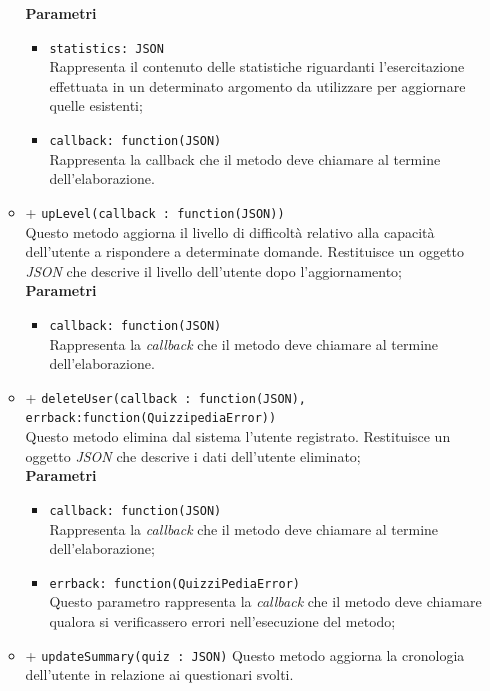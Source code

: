 \begin{itemize}
\begin{itemize}
		\textbf{Parametri} 
			\begin{itemize}
			\item
				\texttt{statistics: JSON} \\
				Rappresenta il contenuto delle statistiche riguardanti l'esercitazione effettuata in un determinato argomento da utilizzare per aggiornare quelle esistenti;
			\item	
				\texttt{callback: function(JSON)} \\
				Rappresenta la callback che il metodo deve chiamare al termine dell'elaborazione.
			\end{itemize}
		\item		
		+ \texttt{upLevel(callback : function(JSON))} \\
		Questo metodo aggiorna il livello di difficoltà relativo alla capacità dell'utente a rispondere a determinate domande. Restituisce un oggetto \textit{JSON} che descrive il livello dell'utente dopo l'aggiornamento;	\\	
		\textbf{Parametri} 
			\begin{itemize}
			\item	
				\texttt{callback: function(JSON)} \\
				Rappresenta la \textit{callback} che il metodo deve chiamare al termine dell'elaborazione.		
			\end{itemize}
		\item		
		+ \texttt{deleteUser(callback : function(JSON), errback:function(QuizzipediaError))} \\	
		Questo metodo elimina dal sistema l'utente registrato. Restituisce un oggetto \textit{JSON} che descrive i dati dell'utente eliminato;	\\	
		\textbf{Parametri} 
			\begin{itemize}
			\item	
				\texttt{callback: function(JSON)} \\
				Rappresenta la \textit{callback} che il metodo deve chiamare al termine dell'elaborazione;	
			\item	
				\texttt{errback: function(QuizziPediaError)} \\
				Questo parametro rappresenta la \textit{callback} che il metodo deve chiamare qualora si verificassero errori nell'esecuzione del metodo;		
			\end{itemize}
		\item	
		+ \texttt{updateSummary(quiz : JSON)}	
		Questo metodo aggiorna la cronologia dell'utente in relazione ai questionari svolti.\\	

\end{itemize}
\end{itemize}
